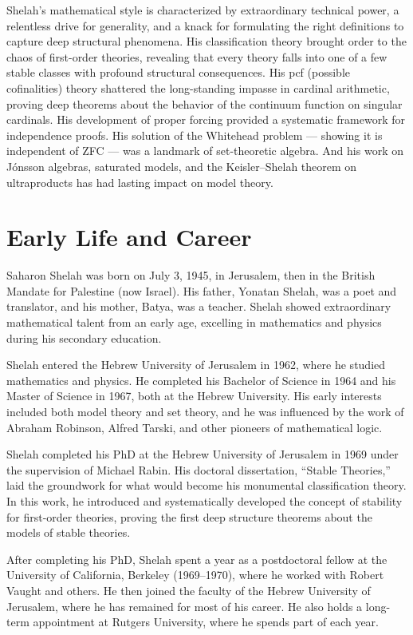Shelah's mathematical style is characterized by extraordinary technical power, a relentless drive for generality, and a knack for formulating the right definitions to capture deep structural phenomena. His classification theory brought order to the chaos of first-order theories, revealing that every theory falls into one of a few stable classes with profound structural consequences. His pcf (possible cofinalities) theory shattered the long-standing impasse in cardinal arithmetic, proving deep theorems about the behavior of the continuum function on singular cardinals. His development of proper forcing provided a systematic framework for independence proofs. His solution of the Whitehead problem --- showing it is independent of ZFC --- was a landmark of set-theoretic algebra. And his work on J\'onsson algebras, saturated models, and the Keisler--Shelah theorem on ultraproducts has had lasting impact on model theory.

\section{Early Life and Career}

Saharon Shelah was born on July 3, 1945, in Jerusalem, then in the British Mandate for Palestine (now Israel). His father, Yonatan Shelah, was a poet and translator, and his mother, Batya, was a teacher. Shelah showed extraordinary mathematical talent from an early age, excelling in mathematics and physics during his secondary education.

Shelah entered the Hebrew University of Jerusalem in 1962, where he studied mathematics and physics. He completed his Bachelor of Science in 1964 and his Master of Science in 1967, both at the Hebrew University. His early interests included both model theory and set theory, and he was influenced by the work of Abraham Robinson, Alfred Tarski, and other pioneers of mathematical logic.

Shelah completed his PhD at the Hebrew University of Jerusalem in 1969 under the supervision of Michael Rabin. His doctoral dissertation, ``Stable Theories,'' laid the groundwork for what would become his monumental classification theory. In this work, he introduced and systematically developed the concept of stability for first-order theories, proving the first deep structure theorems about the models of stable theories.

After completing his PhD, Shelah spent a year as a postdoctoral fellow at the University of California, Berkeley (1969--1970), where he worked with Robert Vaught and others. He then joined the faculty of the Hebrew University of Jerusalem, where he has remained for most of his career. He also holds a long-term appointment at Rutgers University, where he spends part of each year.

